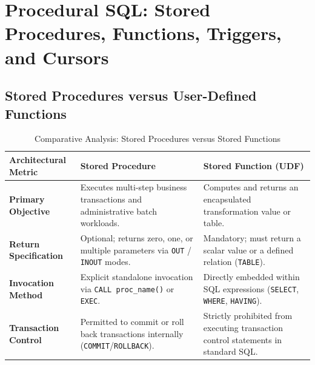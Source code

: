\section{Procedural SQL: Stored Procedures, Functions, Triggers, and Cursors}
\label{sec:dbms_procedural_sql}

\subsection{Stored Procedures versus User-Defined Functions}
\begin{table}[htbp]
\centering
\small
\caption{Comparative Analysis: Stored Procedures versus Stored Functions}
\label{tab:procedures_vs_functions}
\begin{tabularx}{\textwidth}{p{3.2cm} X X}
\toprule
\textbf{Architectural Metric} & \textbf{Stored Procedure} & \textbf{Stored Function (UDF)} \\
\midrule
\textbf{Primary Objective} & Executes multi-step business transactions and administrative batch workloads. & Computes and returns an encapsulated transformation value or table. \\
\textbf{Return Specification} & Optional; returns zero, one, or multiple parameters via \texttt{OUT} / \texttt{INOUT} modes. & Mandatory; must return a scalar value or a defined relation (\texttt{TABLE}). \\
\textbf{Invocation Method} & Explicit standalone invocation via \texttt{CALL proc\_name()} or \texttt{EXEC}. & Directly embedded within SQL expressions (\texttt{SELECT}, \texttt{WHERE}, \texttt{HAVING}). \\
\textbf{Transaction Control} & Permitted to commit or roll back transactions internally (\texttt{COMMIT}/\texttt{ROLLBACK}). & Strictly prohibited from executing transaction control statements in standard SQL. \\
\bottomrule
\end{tabularx}
\end{table}

